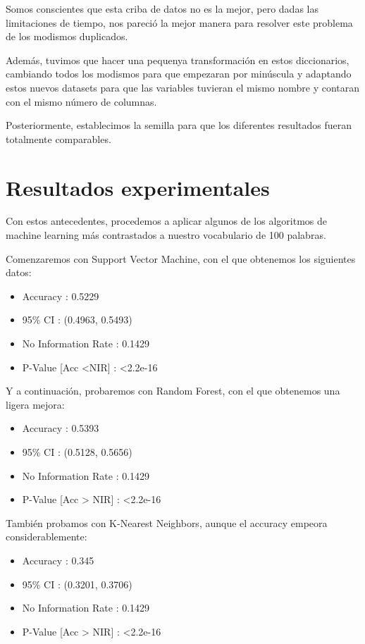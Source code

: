 \documentclass[11pt,a4paper]{article}
\begin{document}
Somos conscientes que esta criba de datos no es la mejor, pero dadas las limitaciones de tiempo, nos pareci\'o la mejor manera para resolver este problema de los modismos duplicados.

Adem\'as, tuvimos que hacer una pequenya transformaci\'on en estos diccionarios, cambiando todos los modismos para que empezaran por min\'uscula y adaptando estos nuevos datasets para que las variables tuvieran el mismo nombre y contaran con el mismo n\'umero de columnas. 

Posteriormente, establecimos la semilla para que los diferentes resultados fueran totalmente comparables. 


\section{Resultados experimentales}

Con estos antecedentes, procedemos a aplicar algunos de los algoritmos de machine learning m\'as contrastados a nuestro vocabulario de 100 palabras. 

Comenzaremos con Support Vector Machine, con el que obtenemos los siguientes datos:
\begin{itemize}
    \item Accuracy : 0.5229 
    \item 95\% CI : (0.4963, 0.5493)
    \item No Information Rate : 0.1429  
    \item P-Value [Acc \textless NIR] : \textless  2.2e-16
\end{itemize}
       


Y a continuación, probaremos con Random Forest, con el que obtenemos una ligera mejora:

\begin{itemize}
    \item Accuracy : 0.5393   
    \item 95\% CI : (0.5128, 0.5656)
    \item No Information Rate : 0.1429  
    \item P-Value [Acc > NIR] : \textless  2.2e-16
\end{itemize}



También probamos con K-Nearest Neighbors, aunque el accuracy empeora considerablemente:

\begin{itemize}
    \item Accuracy : 0.345 
    \item 95\% CI : (0.3201, 0.3706)
    \item No Information Rate : 0.1429  
    \item P-Value [Acc > NIR] : \textless  2.2e-16
\end{itemize}
\end{document}
